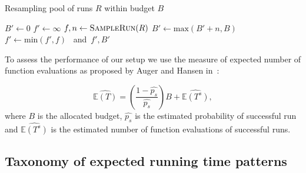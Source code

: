 \documentclass{sig-alternate}
\begin{document}

\begin{algorithm}
\caption{Resampling pool of runs $R$ within budget $B$}
\label{alg:resample}
\begin{algorithmic}[1]
    \State $B' \gets 0$
    \State $f' \gets \infty$
    \Do
        \State $f, n \gets \Call{SampleRun}{R}$%
        \State $B' \gets \mbox{max}(B' + n, B)$
        \State $f' \gets \mbox{min}(f', f)$
    \EndFunction \mbox{ and }\Return $f', B'$
\end{algorithmic}
\end{algorithm}

To assess the performance of our setup we use the measure of expected number of function evaluations as proposed by Auger and Hansen in~\cite{Hansen05performanceevaluation}:

\begin{equation}
    \widehat{\mathbb{E}(T)} = \left(\dfrac{1 - \widehat{p_s}}{\widehat{p_s}}\right) B + \widehat{\mathbb{E}(T^s)},
\end{equation}
where $B$ is the allocated budget, $\widehat{p_s}$ is the estimated probability of successful run and $\widehat{\mathbb{E}(T^s)}$ is the estimated number of function evaluations of successful runs.


\subsection{Taxonomy of expected running time patterns}
\end{document}
